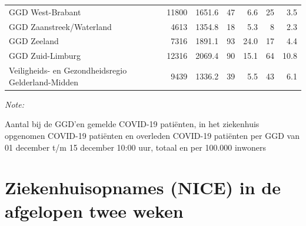 \documentclass[
  english,
  man,floatsintext]{apa6}
\begin{document}
\begin{table}
\begin{threeparttable}
\begin{tabular}{lrrrrrr}
GGD West-Brabant & 11800 & 1651.6 & 47 & 6.6 & 25 & 3.5\\
GGD Zaanstreek/Waterland & 4613 & 1354.8 & 18 & 5.3 & 8 & 2.3\\
GGD Zeeland & 7316 & 1891.1 & 93 & 24.0 & 17 & 4.4\\
GGD Zuid-Limburg & 12316 & 2069.4 & 90 & 15.1 & 64 & 10.8\\
Veiligheids- en Gezondheidsregio Gelderland-Midden & 9439 & 1336.2 & 39 & 5.5 & 43 & 6.1\\
\bottomrule
\end{tabular}
\begin{tablenotes}
\item \textit{Note: } 
\item Aantal bij de GGD’en gemelde COVID-19 patiënten, in het ziekenhuis opgenomen COVID-19 patiënten en overleden COVID-19 patiënten per GGD van 01 december t/m 15 december 10:00 uur, totaal en per 100.000 inwoners
\end{tablenotes}
\end{threeparttable}
\endgroup{}
\end{table}

\newpage

\hypertarget{ziekenhuisopnames-nice-in-de-afgelopen-twee-weken}{%
\section{Ziekenhuisopnames (NICE) in de afgelopen twee weken}\label{ziekenhuisopnames-nice-in-de-afgelopen-twee-weken}}
\end{document}
